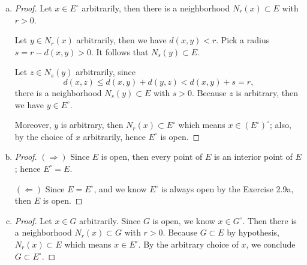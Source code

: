 \begin{Exercise}
\begin{enumerate}[a)]
\item
\begin{proof}
Let $x\in E^{\circ}$ arbitrarily, then there is a neighborhood $N_r(x)\subset E$ with $r>0$.

Let $y\in N_r(x)$ arbitrarily, then we have $d(x,y)<r$. Pick a radius $s=r-d(x,y)>0$. It follows that $N_s(y)\subset E$. 

Let $z\in N_s(y)$ arbitrarily, since
$$
d(x,z) \leq d(x,y)+d(y,z) < d(x,y) + s = r,
$$
there is a neighborhood $N_s(y)\subset E$ with $s>0$. Because $z$ is arbitrary, then we have $y\in E^{\circ}$.

Moreover, $y$ is arbitrary, then $N_r(x)\subset E^{\circ}$ which means $x\in (E^{\circ})^{\circ}$; also, by the choice of $x$ arbitrarily, hence $E^{\circ}$ is open.
\end{proof}

\item
\begin{proof}
$(\Longrightarrow)$
Since $E$ is open, then every point of $E$ is an interior point of $E$; hence $E^{\circ} = E$.

$(\Longleftarrow)$
Since $E = E^{\circ}$, and we know $E^{\circ}$ is always open by the Exercise 2.9a, then $E$ is open.
\end{proof}

\item
\begin{proof}
Let $x\in G$ arbitrarily. Since $G$ is open, we know $x\in G^{\circ}$. Then there is a neighborhood $N_r(x)\subset G$ with $r>0$. Because $G\subset E$ by hypothesis, $N_r(x)\subset E$ which means $x\in E^{\circ}$. By the arbitrary choice of $x$, we conclude $G\subset E^{\circ}$.
\end{proof}
\end{enumerate}
\end{Exercise}